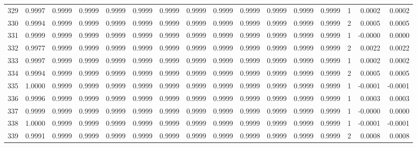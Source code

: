 \begin{tabular}{lrrrrrrrrrrrrrrr}
329 &      0.9997 &  0.9999 &  0.9999 &  0.9999 &  0.9999 &  0.9999 &  0.9999 &  0.9999 &  0.9999 &  0.9999 &   0.9999 &     0.9999 &      1 &                    0.0002 &                     0.0002 \\
330 &      0.9994 &  0.9999 &  0.9999 &  0.9999 &  0.9999 &  0.9999 &  0.9999 &  0.9999 &  0.9999 &  0.9999 &   0.9999 &     0.9999 &      2 &                    0.0005 &                     0.0005 \\
331 &      0.9999 &  0.9999 &  0.9999 &  0.9999 &  0.9999 &  0.9999 &  0.9999 &  0.9999 &  0.9999 &  0.9999 &   0.9999 &     0.9999 &      1 &                   -0.0000 &                     0.0000 \\
332 &      0.9977 &  0.9999 &  0.9999 &  0.9999 &  0.9999 &  0.9999 &  0.9999 &  0.9999 &  0.9999 &  0.9999 &   0.9999 &     0.9999 &      2 &                    0.0022 &                     0.0022 \\
333 &      0.9997 &  0.9999 &  0.9999 &  0.9999 &  0.9999 &  0.9999 &  0.9999 &  0.9999 &  0.9999 &  0.9999 &   0.9999 &     0.9999 &      1 &                    0.0002 &                     0.0002 \\
334 &      0.9994 &  0.9999 &  0.9999 &  0.9999 &  0.9999 &  0.9999 &  0.9999 &  0.9999 &  0.9999 &  0.9999 &   0.9999 &     0.9999 &      2 &                    0.0005 &                     0.0005 \\
335 &      1.0000 &  0.9999 &  0.9999 &  0.9999 &  0.9999 &  0.9999 &  0.9999 &  0.9999 &  0.9999 &  0.9999 &   0.9999 &     0.9999 &      1 &                   -0.0001 &                    -0.0001 \\
336 &      0.9996 &  0.9999 &  0.9999 &  0.9999 &  0.9999 &  0.9999 &  0.9999 &  0.9999 &  0.9999 &  0.9999 &   0.9999 &     0.9999 &      1 &                    0.0003 &                     0.0003 \\
337 &      0.9999 &  0.9999 &  0.9999 &  0.9999 &  0.9999 &  0.9999 &  0.9999 &  0.9999 &  0.9999 &  0.9999 &   0.9999 &     0.9999 &      1 &                   -0.0000 &                     0.0000 \\
338 &      1.0000 &  0.9999 &  0.9999 &  0.9999 &  0.9999 &  0.9999 &  0.9999 &  0.9999 &  0.9999 &  0.9999 &   0.9999 &     0.9999 &      1 &                   -0.0001 &                    -0.0001 \\
339 &      0.9991 &  0.9999 &  0.9999 &  0.9999 &  0.9999 &  0.9999 &  0.9999 &  0.9999 &  0.9999 &  0.9999 &   0.9999 &     0.9999 &      2 &                    0.0008 &                     0.0008 \\

\end{tabular}
